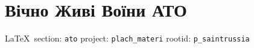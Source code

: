  
 
\chapter{Вічно Живі Воїни АТО}
  
\vspace{0.5cm}
{\small\LaTeX~section: \verb|ato| project: \verb|plach_materi| rootid: \verb|p_saintrussia|}
\vspace{0.5cm}

  
